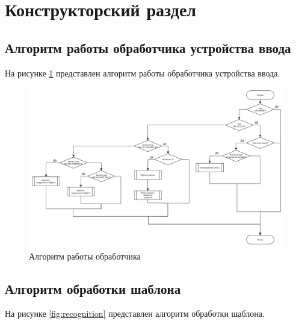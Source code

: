 \section{Конструкторский раздел}

\subsection{Алгоритм работы обработчика устройства ввода}

На рисунке \ref{fig:alg} представлен алгоритм работы обработчика устройства ввода.

\begin{figure}[H]
	\centering
	\includegraphics[width=\textwidth]{inc/alg.pdf}
	\caption{Алгоритм работы обработчика}
	\label{fig:alg}
\end{figure}

\clearpage

\subsection{Алгоритм обработки шаблона}

На рисунке \ref{fig:recognition} представлен алгоритм обработки шаблона.

